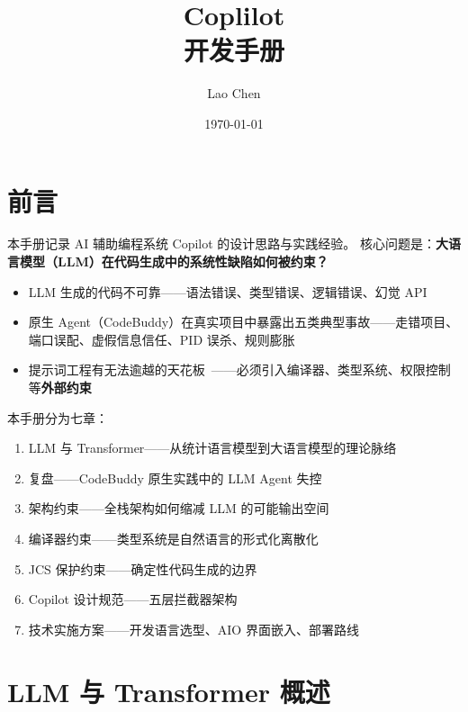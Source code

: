 \documentclass[10pt, openany]{book}
\begin{document}
\frontmatter

\title{\textbf{Coplilot}\\ \large 开发手册 }
\author{Lao Chen}
\date{\today}
\maketitle
\tableofcontents

\mainmatter

\chapter*{前言}
{}

本手册记录 AI 辅助编程系统 Copilot 的设计思路与实践经验。
核心问题是：\textbf{大语言模型（LLM）在代码生成中的系统性缺陷如何被约束？}

\begin{itemize}
    \item LLM 生成的代码不可靠——语法错误、类型错误、逻辑错误、幻觉 API~\cite{Chen2021Codex}
    \item 原生 Agent（CodeBuddy）在真实项目中暴露出五类典型事故——走错项目、端口误配、虚假信息信任、PID 误杀、规则膨胀
    \item 提示词工程有无法逾越的天花板~\cite{Liu2023LostInMiddle}——必须引入编译器、类型系统、权限控制等\textbf{外部约束}
\end{itemize}

本手册分为七章：
\begin{enumerate}
    \item LLM 与 Transformer——从统计语言模型到大语言模型的理论脉络
    \item 复盘——CodeBuddy 原生实践中的 LLM Agent 失控
    \item 架构约束——全栈架构如何缩减 LLM 的可能输出空间
    \item 编译器约束——类型系统是自然语言的形式化离散化
    \item JCS 保护约束——确定性代码生成的边界
    \item Copilot 设计规范——五层拦截器架构
    \item 技术实施方案——开发语言选型、AIO 界面嵌入、部署路线
\end{enumerate}

\chapter{LLM 与 Transformer 概述}
\end{document}
